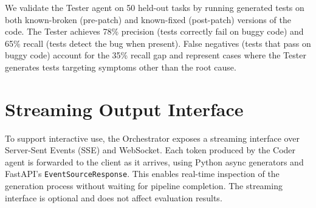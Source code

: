 \documentclass[journal]{IEEEtran}
\begin{document}
We validate the Tester agent on 50 held-out tasks by running generated tests on both known-broken (pre-patch) and known-fixed (post-patch) versions of the code. The Tester achieves 78\% precision (tests correctly fail on buggy code) and 65\% recall (tests detect the bug when present). False negatives (tests that pass on buggy code) account for the 35\% recall gap and represent cases where the Tester generates tests targeting symptoms other than the root cause.

\section{Streaming Output Interface}
\label{app:streaming}

To support interactive use, the Orchestrator exposes a streaming interface over Server-Sent Events (SSE) and WebSocket. Each token produced by the Coder agent is forwarded to the client as it arrives, using Python async generators and FastAPI's \texttt{EventSourceResponse}. This enables real-time inspection of the generation process without waiting for pipeline completion. The streaming interface is optional and does not affect evaluation results.




\end{document}
